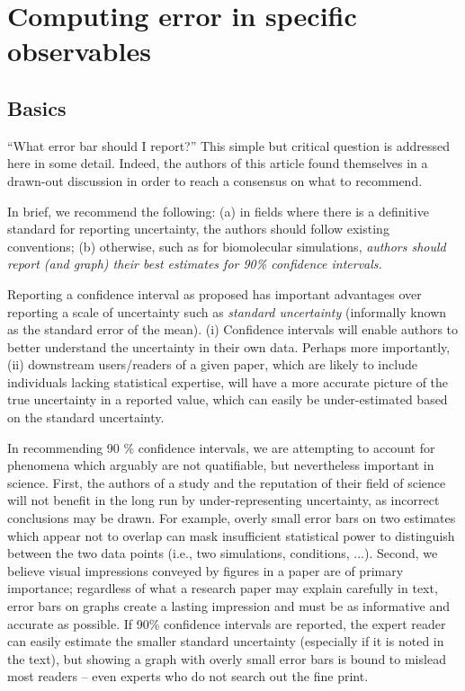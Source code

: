 \section{Computing error in specific observables}
\label{sec:specific}

\subsection{Basics}
``What error bar should I report?''
This simple but critical question is addressed here in some detail.
Indeed, the authors of this article found themselves in a drawn-out discussion in order to reach a consensus on what to recommend.

In brief, we recommend the following:
(a) in fields where there is a definitive standard for reporting uncertainty, the authors should follow existing conventions;
(b) otherwise, such as for biomolecular simulations, \emph{authors should report (and graph) their best estimates for 90\% confidence intervals.}

Reporting a confidence interval as proposed has important advantages over reporting a scale of uncertainty such as \emph{standard uncertainty} (informally known as the standard error of the mean).  
(i) Confidence intervals will enable authors to better understand the uncertainty in their own data.  
Perhaps more importantly, (ii) downstream users/readers of a given paper, which are likely to include individuals lacking statistical expertise, will have a more accurate picture of the true uncertainty in a reported value, which can easily be under-estimated based on the standard uncertainty.  

In recommending 90 \% confidence intervals, we are attempting to account for phenomena which arguably are not quatifiable, but nevertheless important in science.  
First, the authors of a study and the reputation of their field of science will not benefit in the long run by under-representing uncertainty, as incorrect conclusions may be drawn.  
For example, overly small error bars on two estimates which appear not to overlap can mask insufficient statistical power to distinguish between the two data points (i.e., two simulations, conditions, ...).
Second, we believe visual impressions conveyed by figures in a paper are of primary importance; regardless of what a research paper may explain carefully in text, error bars on graphs create a lasting impression and must be as informative and accurate as possible.
If 90\% confidence intervals are reported, the expert reader can easily estimate the smaller standard uncertainty (especially if it is noted in the text), but showing a graph with overly small error bars is bound to mislead most readers -- even experts who do not search out the fine print.

